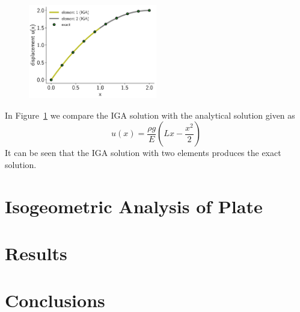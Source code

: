 \documentclass[submit,12pt]{aiaa-pretty} %
\begin{document}
\begin{figure}\label{eqn:bar-solution}
  \centering
  \includegraphics[width=0.5\textwidth]{figures/bar-solution.pdf} \\
\end{figure}
In Figure~\ref{eqn:bar-solution} we compare the IGA solution with the analytical solution given as
\begin{equation}\nonumber
  u(x) = \frac{\rho g}{E} \left( Lx - \frac{x^2}{2}\right)
\end{equation}
It can be seen that the IGA solution with two elements produces the
exact solution.

\section{Isogeometric Analysis of Plate}


\section{Results}

\section{Conclusions}
 
\end{document}
